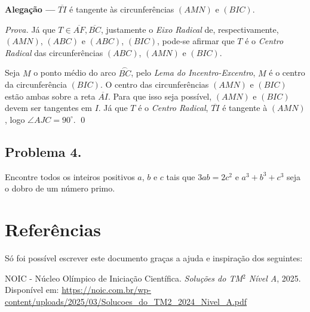 \documentclass[12pt]{article}
\begin{document}
      \begin{tcolorbox}[claimbox={Claim}]
        \textbf{\sffamily\textcolor{color1}{Alegação ---}} $\overline{TI}$ é tangente às circunferências
        $(AMN)$ e $(BIC)$.
      \end{tcolorbox}

      \textit{Prova.} Já que $T \in \overline{AF}, \overline{BC}$, justamente o \textit{Eixo Radical}
      de, respectivamente, $(AMN)$, $(ABC)$ e $(ABC)$, $(BIC)$, pode-se afirmar que $T$ é o \textit{Centro
      Radical} das circunferências $(ABC)$, $(AMN)$ e $(BIC)$.

      Seja $M$ o ponto médio do arco $\overset{\frown}{BC}$, pelo \textit{Lema do Incentro-Excentro}, $M$
      é o centro da circunferência $(BIC)$. O centro das circunferências $(AMN)$ e $(BIC)$ estão ambas sobre
      a reta $\overline{AI}$. Para que isso seja possível, $(AMN)$ e $(BIC)$ devem ser tangentes em $I$. Já
      que $T$ é o \textit{Centro Radical}, $\overline{TI}$ é tangente à $(AMN)$, logo $\angle AJC = 90^{\circ}$. \qed

      \clearpage
    
    \subsection{Problema 4.}
      \begin{tcolorbox}[problembox={Enunciado do problema}]
        Encontre todos os inteiros positivos $a$, $b$ e $c$ tais que $3ab = 2c^2$
        e $ a^3 + b^3 + c^3$ seja o dobro de um número primo.
      \end{tcolorbox}

  \clearpage
  
  \section{\textsf{Referências}}
  Só foi possível escrever este documento graças a ajuda e inspiração dos seguintes:

  \renewcommand{\refname}{\vspace{-2em}}
  \begin{thebibliography}{9}
    NOIC - Núcleo Olímpico de Iniciação Científica.
    \textit{Soluções do TM$^2$ Nível A}, 2025.
    Disponível em: \url{https://noic.com.br/wp-content/uploads/2025/03/Solucoes_do_TM2_2024_Nivel_A.pdf}
  \end{thebibliography}
\end{document}
